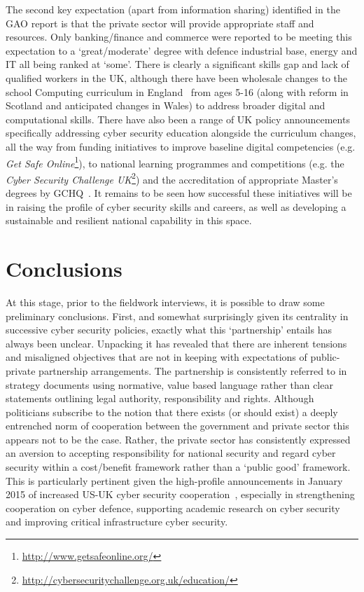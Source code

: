 \documentclass[a4paper,11pt]{article}
\begin{document}
The second key expectation (apart from information sharing) identified
in the GAO report is that the private sector will provide appropriate
staff and resources. Only banking/finance and commerce were reported
to be meeting this expectation to a `great/moderate' degree with
defence industrial base, energy and IT all being ranked at
`some'. There is clearly a significant skills gap and lack of
qualified workers in the UK, although there have been wholesale
changes to the school Computing curriculum in
England~\cite{comppos:2013} from ages 5-16 (along with reform in
Scotland and anticipated changes in Wales) to address broader digital
and computational skills. There have also been a range of UK policy
announcements specifically addressing cyber security education
alongside the curriculum changes, all the way from funding initiatives
to improve baseline digital competencies (e.g. {\emph{Get Safe
Online}}\footnote{\url{http://www.getsafeonline.org/}}), to national
learning programmes and competitions (e.g. the {\emph{Cyber Security
Challenge
UK}}\footnote{\url{http://cybersecuritychallenge.org.uk/education/}})
and the accreditation of appropriate Master's degrees by
GCHQ~\cite{gchqmasters:2014}. It remains to be seen how successful
these initiatives will be in raising the profile of cyber security
skills and careers, as well as developing a sustainable and resilient
national capability in this space.

\section{Conclusions}

At this stage, prior to the fieldwork interviews, it is possible to
draw some preliminary conclusions. First, and somewhat surprisingly
given its centrality in successive cyber security policies, exactly
what this `partnership' entails has always been unclear.  Unpacking it
has revealed that there are inherent tensions and misaligned
objectives that are not in keeping with expectations of public-private
partnership arrangements. The partnership is consistently referred to
in strategy documents using normative, value based language rather
than clear statements outlining legal authority, responsibility and
rights. Although politicians subscribe to the notion that there exists
(or should exist) a deeply entrenched norm of cooperation between the
government and private sector this appears not to be the case. Rather,
the private sector has consistently expressed an aversion to accepting
responsibility for national security and regard cyber security within
a cost/benefit framework rather than a `public good' framework. This
is particularly pertinent given the high-profile announcements in
January 2015 of increased US-UK cyber security
cooperation~\cite{whitehouse:2015}, especially in strengthening
cooperation on cyber defence, supporting academic research on
cyber security and improving critical infrastructure cyber security.
\end{document}
